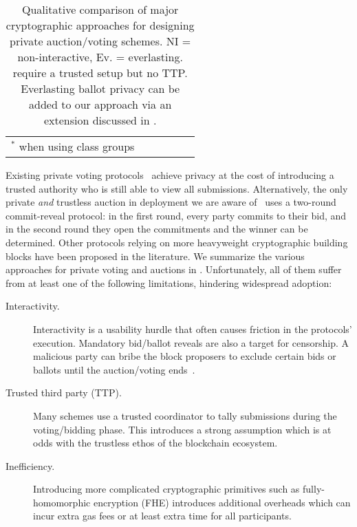 \begin{table*}[tb]
{\begin{tabular}{lccccc}
     \bottomrule
     $^{*}$ when using class groups &&&&&
    \end{tabular}
    }
    \caption{Qualitative comparison of major cryptographic approaches for designing private auction/voting schemes. 
    NI = non-interactive, Ev. = everlasting. \cite{C:AOZZ15,ESORICS:CJSS21} require a trusted setup but no TTP. Everlasting ballot privacy can be added to our approach via an extension discussed in \cite{EPRINT:GSZB23}.
    }
    \label{table:approaches}
    \end{table*}

Existing private voting protocols~\cite{maci,plume,rln} achieve privacy at the cost of introducing a trusted authority who is still able to view all submissions.
Alternatively, the only private \emph{and} trustless auction in deployment we are aware of~\cite{ARXIV:XWYLLX21} uses a two-round commit-reveal protocol: in the first round, every party commits to their bid, and in the second round they open the commitments and the winner can be determined.
Other protocols relying on more heavyweight cryptographic building blocks have been proposed in the literature.
We summarize the various approaches for private voting and auctions in .
Unfortunately, all of them suffer from at least one of the following limitations, hindering widespread adoption:

\begin{description}
    \item[Interactivity.] Interactivity is a usability hurdle that often causes friction in the protocols' execution. Mandatory bid/ballot reveals are also a target for censorship.     
    A malicious party can bribe the block proposers to exclude certain bids or ballots until the auction/voting ends~\cite{ARXIV:PaiResFox23}. %
    \item[Trusted third party (TTP).] Many schemes use a trusted coordinator to tally submissions during the voting/bidding phase. This introduces a strong assumption which is at odds with the trustless ethos of the blockchain ecosystem.
    \item[Inefficiency.] Introducing more complicated cryptographic primitives such as fully-homomorphic encryption (FHE) introduces additional overheads which can incur extra gas fees or at least extra time for all participants.
\end{description}


